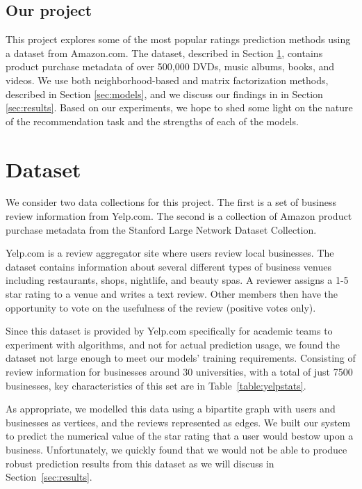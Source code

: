 \documentclass[letterpaper, 10 pt, conference]{ieeeconf}
\begin{document}
\subsection{Our project}
This project explores some of the most popular ratings prediction methods using 
a dataset from Amazon.com. The dataset, described in Section 
\ref{sec:dataset}, contains product purchase metadata of over 500,000 DVDs, 
music albums, books, and videos. We use both neighborhood-based and 
matrix factorization methods, described in Section \ref{sec:models}, and we 
discuss our findings in in Section \ref{sec:results}. Based on our 
experiments, we hope to shed some light on the nature of the recommendation 
task and the strengths of each of the models.


\section{Dataset}
\label{sec:dataset}
We consider two data collections for this project. The first is a set of business
review information from Yelp.com. The second is a collection of Amazon product 
purchase metadata from the Stanford Large Network Dataset Collection.

Yelp.com is a review aggregator site where users review local
businesses. The dataset contains information about several different types of
business venues including restaurants, shops,
nightlife, and beauty spas. A reviewer assigns a 1-5 star rating to a venue and
writes a text review. Other members then have the opportunity to vote on the
usefulness of the review (positive votes only).

Since this dataset is provided by Yelp.com specifically for academic teams to
experiment with algorithms, and not for actual prediction usage, we found the
dataset not large enough to meet our models' training requirements.
Consisting of review information for businesses around 30 universities,
with a total of just 7500 businesses, key characteristics of this set
are in Table~\ref{table:yelpstats}.

As appropriate, we modelled this data using a bipartite graph with users and
businesses as vertices, and the reviews represented as edges.
We built our system to predict the numerical value of the star
rating that a user would bestow upon a business. Unfortunately, we quickly
found that we would not be able to produce robust prediction results from
this dataset as we will discuss in Section~\ref{sec:results}.
\end{document}
